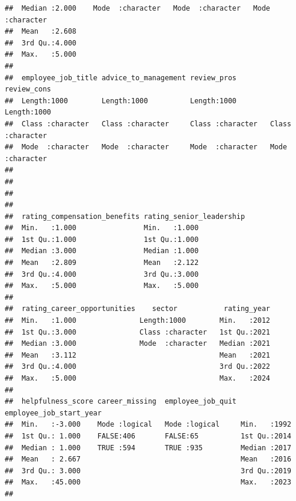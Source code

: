 \documentclass[
]{article}
\begin{document}
\begin{verbatim}
##  Median :2.000    Mode  :character   Mode  :character   Mode  :character  
##  Mean   :2.608                                                            
##  3rd Qu.:4.000                                                            
##  Max.   :5.000                                                            
##                                                                           
##  employee_job_title advice_to_management review_pros        review_cons       
##  Length:1000        Length:1000          Length:1000        Length:1000       
##  Class :character   Class :character     Class :character   Class :character  
##  Mode  :character   Mode  :character     Mode  :character   Mode  :character  
##                                                                               
##                                                                               
##                                                                               
##                                                                               
##  rating_compensation_benefits rating_senior_leadership
##  Min.   :1.000                Min.   :1.000           
##  1st Qu.:1.000                1st Qu.:1.000           
##  Median :3.000                Median :1.000           
##  Mean   :2.809                Mean   :2.122           
##  3rd Qu.:4.000                3rd Qu.:3.000           
##  Max.   :5.000                Max.   :5.000           
##                                                       
##  rating_career_opportunities    sector           rating_year  
##  Min.   :1.000               Length:1000        Min.   :2012  
##  1st Qu.:3.000               Class :character   1st Qu.:2021  
##  Median :3.000               Mode  :character   Median :2021  
##  Mean   :3.112                                  Mean   :2021  
##  3rd Qu.:4.000                                  3rd Qu.:2022  
##  Max.   :5.000                                  Max.   :2024  
##                                                               
##  helpfulness_score career_missing  employee_job_quit employee_job_start_year
##  Min.   :-3.000    Mode :logical   Mode :logical     Min.   :1992           
##  1st Qu.: 1.000    FALSE:406       FALSE:65          1st Qu.:2014           
##  Median : 1.000    TRUE :594       TRUE :935         Median :2017           
##  Mean   : 2.667                                      Mean   :2016           
##  3rd Qu.: 3.000                                      3rd Qu.:2019           
##  Max.   :45.000                                      Max.   :2023           
##                                                                             

\end{verbatim}
\end{document}
